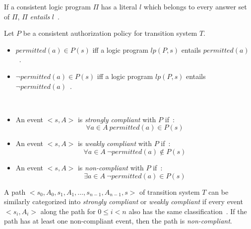 \begin{definition}
    \label{def:entails}
    If a consistent logic program $\Pi$ has a literal $l$ which belongs to every answer set of $\Pi$, $\Pi$ \textit{entails} $l$~\citep{gelfond_authorization_2008}.
\end{definition}

\begin{definition}
    Let $P$ be a consistent authorization policy for transition system $T$.

    \begin{itemize}
        \item $permitted(a) \in P(s)$ iff a logic program $lp(P, s)$ entails $permitted(a)$~\citep{gelfond_authorization_2008}.
        \item $\neg permitted(a) \in P(s)$ iff a logic program $lp(P, s)$ entails $\neg permitted(a)$~\citep{gelfond_authorization_2008}.
    \end{itemize}
\end{definition}

\begin{definition}
    \label{def:authorization_event_compliance}
    ~

    \begin{itemize}
        \item An event $<s, A>$ is \textit{strongly compliant} with $P$ if~\citep{gelfond_authorization_2008}:
            \begin{equation}
                \forall a \in A\ permitted(a) \in P(s)
            \end{equation}
        \item An event $<s, A>$ is \textit{weakly compliant} with $P$ if~\citep{gelfond_authorization_2008}:
            \begin{equation}
                \forall a \in A\ \neg permitted(a) \not \in P(s)
            \end{equation}
        \item An event $<s, A>$ is \textit{non-compliant} with $P$ if~\citep{gelfond_authorization_2008}:
            \begin{equation}
                \exists a \in A\ \neg permitted(a) \in P(s)
            \end{equation}
    \end{itemize}
\end{definition}

\begin{definition}
    \label{def:authorization_path_compliance}
    A path $<s_0, A_0, s_1, A_1, \dots, s_{n-1}, A_{n-1}, s>$ of transition system $T$ can be similarly categorized into \textit{strongly compliant} or \textit{weakly compliant} if every event $<s_i, A_i>$ along the path for $0 \le i < n$ also has the same classification~\citep{gelfond_authorization_2008}.
    If the path has at least one non-compliant event, then the path is \textit{non-compliant}.
\end{definition}

